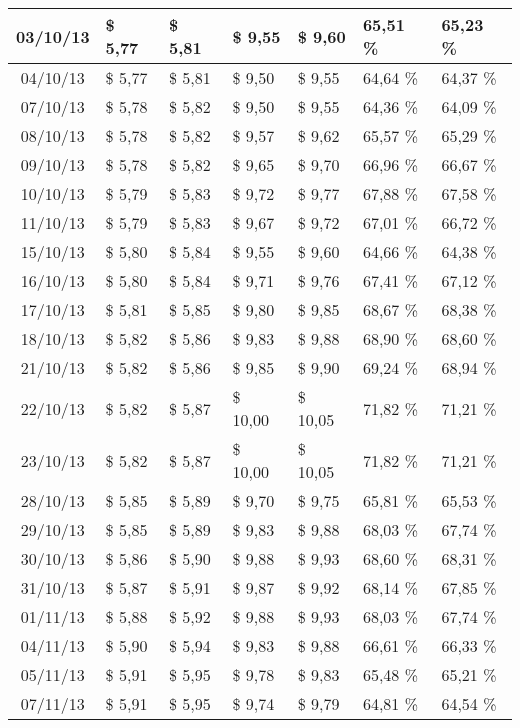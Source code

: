 \begin{center}
\begin{longtable}{|c|p{1.5cm}|p{1.5cm}|p{1.5cm}|p{1.5cm}|p{1.5cm}|p{1.5cm}|}
03/10/13 & \$ 5,77 & \$ 5,81 & \$ 9,55 & \$ 9,60 & 65,51 \% & 65,23 \% \\ \hline
04/10/13 & \$ 5,77 & \$ 5,81 & \$ 9,50 & \$ 9,55 & 64,64 \% & 64,37 \% \\ \hline
07/10/13 & \$ 5,78 & \$ 5,82 & \$ 9,50 & \$ 9,55 & 64,36 \% & 64,09 \% \\ \hline
08/10/13 & \$ 5,78 & \$ 5,82 & \$ 9,57 & \$ 9,62 & 65,57 \% & 65,29 \% \\ \hline
09/10/13 & \$ 5,78 & \$ 5,82 & \$ 9,65 & \$ 9,70 & 66,96 \% & 66,67 \% \\ \hline
10/10/13 & \$ 5,79 & \$ 5,83 & \$ 9,72 & \$ 9,77 & 67,88 \% & 67,58 \% \\ \hline
11/10/13 & \$ 5,79 & \$ 5,83 & \$ 9,67 & \$ 9,72 & 67,01 \% & 66,72 \% \\ \hline
15/10/13 & \$ 5,80 & \$ 5,84 & \$ 9,55 & \$ 9,60 & 64,66 \% & 64,38 \% \\ \hline
16/10/13 & \$ 5,80 & \$ 5,84 & \$ 9,71 & \$ 9,76 & 67,41 \% & 67,12 \% \\ \hline
17/10/13 & \$ 5,81 & \$ 5,85 & \$ 9,80 & \$ 9,85 & 68,67 \% & 68,38 \% \\ \hline
18/10/13 & \$ 5,82 & \$ 5,86 & \$ 9,83 & \$ 9,88 & 68,90 \% & 68,60 \% \\ \hline
21/10/13 & \$ 5,82 & \$ 5,86 & \$ 9,85 & \$ 9,90 & 69,24 \% & 68,94 \% \\ \hline
22/10/13 & \$ 5,82 & \$ 5,87 & \$ 10,00 & \$ 10,05 & 71,82 \% & 71,21 \% \\ \hline
23/10/13 & \$ 5,82 & \$ 5,87 & \$ 10,00 & \$ 10,05 & 71,82 \% & 71,21 \% \\ \hline
28/10/13 & \$ 5,85 & \$ 5,89 & \$ 9,70 & \$ 9,75 & 65,81 \% & 65,53 \% \\ \hline
29/10/13 & \$ 5,85 & \$ 5,89 & \$ 9,83 & \$ 9,88 & 68,03 \% & 67,74 \% \\ \hline
30/10/13 & \$ 5,86 & \$ 5,90 & \$ 9,88 & \$ 9,93 & 68,60 \% & 68,31 \% \\ \hline
31/10/13 & \$ 5,87 & \$ 5,91 & \$ 9,87 & \$ 9,92 & 68,14 \% & 67,85 \% \\ \hline
01/11/13 & \$ 5,88 & \$ 5,92 & \$ 9,88 & \$ 9,93 & 68,03 \% & 67,74 \% \\ \hline
04/11/13 & \$ 5,90 & \$ 5,94 & \$ 9,83 & \$ 9,88 & 66,61 \% & 66,33 \% \\ \hline
05/11/13 & \$ 5,91 & \$ 5,95 & \$ 9,78 & \$ 9,83 & 65,48 \% & 65,21 \% \\ \hline
07/11/13 & \$ 5,91 & \$ 5,95 & \$ 9,74 & \$ 9,79 & 64,81 \% & 64,54 \% \\ \hline

\end{longtable}
\end{center}
